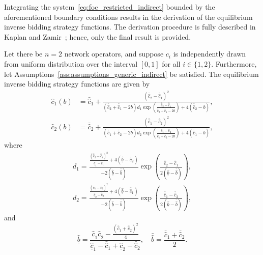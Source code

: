 Integrating the system~\eqref{eq:foc_restricted_indirect} bounded by the aforementioned boundary conditions results in the derivation of the equilibrium inverse bidding strategy functions. The derivation procedure is fully described in Kaplan and Zamir~\cite{KaplanZamir2007}; hence, only the final result is provided.
\begin{proposition}
\label{prop:equilibrium_restricted_indirect}
Let there be $n=2$ network operators, and suppose $c_i$ is independently drawn from uniform distribution over the interval $[0,1]$ for all $i\in \{1, 2\}$. Furthermore, let Assumptions~\ref{ass:assumptions_generic_indirect} be satisfied. The equilibrium inverse bidding strategy functions are given by
\begin{align}
  \label{eq:inverse_equi_bidding_str_1_indirect}
  \hat{c}_1(b) &= \bar{\hat{c}}_1 + \frac{(\bar{\hat{c}}_2 - \bar{\hat{c}}_1)^2}{(\bar{\hat{c}}_2 + \bar{\hat{c}}_1 - 2b)d_1 \exp{\left(\displaystyle\frac{\bar{\hat{c}}_2 - \bar{\hat{c}}_1}{\bar{\hat{c}}_2 + \bar{\hat{c}}_1 - 2b}\right)} + 4(\bar{\hat{c}}_2 - b)},\\[2ex]
  \label{eq:inverse_equi_bidding_str_2_indirect}
  \hat{c}_2(b) &= \bar{\hat{c}}_2 + \frac{(\bar{\hat{c}}_1 - \bar{\hat{c}}_2)^2}{(\bar{\hat{c}}_1 + \bar{\hat{c}}_2 - 2b)d_2 \exp{\left(\displaystyle\frac{\bar{\hat{c}}_1 - \bar{\hat{c}}_2}{\bar{\hat{c}}_1 + \bar{\hat{c}}_2 - 2b}\right)} + 4(\bar{\hat{c}}_1 - b)},
\end{align}
where
\begin{align}
  \label{eq:constant_d_1_indirect}
  d_1 = \frac{\displaystyle\frac{(\bar{\hat{c}}_2 - \bar{\hat{c}}_1)^2}{\underline{\hat{c}}_1 - \bar{\hat{c}}_1} + 4(\underline{\hat{b}} - \bar{\hat{c}}_2)}{-2(\underline{\hat{b}} - \bar{\hat{b}})} \exp{\left(\displaystyle\frac{\bar{\hat{c}}_2 - \bar{\hat{c}}_1}{2(\underline{\hat{b}} - \bar{\hat{b}})}\right)}, \\[2ex]
  \label{eq:constant_d_2_indirect}
  d_2 = \frac{\displaystyle\frac{(\bar{\hat{c}}_1 - \bar{\hat{c}}_2)^2}{\underline{\hat{c}}_2 - \bar{\hat{c}}_2} + 4(\underline{\hat{b}} - \bar{\hat{c}}_1)}{-2(\underline{\hat{b}} - \bar{\hat{b}})} \exp{\left(\frac{\bar{\hat{c}}_1 - \bar{\hat{c}}_2}{2(\underline{\hat{b}} - \bar{\hat{b}})}\right)},
\end{align}
and
\begin{equation}
  \label{eq:bounds_bid_restricted_indirect}
  \underline{\hat{b}} = \frac{\underline{\hat{c}}_1\underline{\hat{c}}_2 - \displaystyle\frac{(\bar{\hat{c}}_1 + \bar{\hat{c}}_2)^2}{4}}{\underline{\hat{c}}_1 - \bar{\hat{c}}_1 + \underline{\hat{c}}_2 - \bar{\hat{c}}_2},\quad
  \bar{\hat{b}} = \frac{\bar{\hat{c}}_1 + \bar{\hat{c}}_2}{2}.
\end{equation}
\end{proposition}
